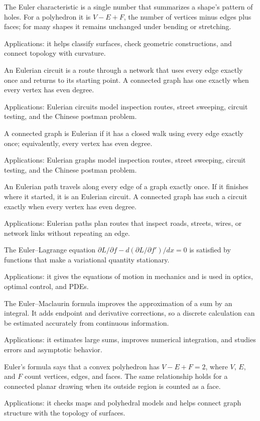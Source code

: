 The Euler characteristic is a single number that summarizes a shape's pattern of holes. For a polyhedron it is $V-E+F$, the number of vertices minus edges plus faces; for many shapes it remains unchanged under bending or stretching. \par\noindent Applications: it helps classify surfaces, check geometric constructions, and connect topology with curvature.

An Eulerian circuit is a route through a network that uses every edge exactly once and returns to its starting point. A connected graph has one exactly when every vertex has even degree. \par\noindent Applications: Eulerian circuits model inspection routes, street sweeping, circuit testing, and the Chinese postman problem.

A connected graph is Eulerian if it has a closed walk using every edge exactly once; equivalently, every vertex has even degree. \par\noindent Applications: Eulerian graphs model inspection routes, street sweeping, circuit testing, and the Chinese postman problem.

An Eulerian path travels along every edge of a graph exactly once. If it finishes where it started, it is an Eulerian circuit. A connected graph has such a circuit exactly when every vertex has even degree. \par\noindent Applications: Eulerian paths plan routes that inspect roads, streets, wires, or network links without repeating an edge.

The Euler--Lagrange equation $\partial L/\partial f-d(\partial L/\partial f')/dx=0$ is satisfied by functions that make a variational quantity stationary. \par\noindent Applications: it gives the equations of motion in mechanics and is used in optics, optimal control, and PDEs.

The Euler--Maclaurin formula improves the approximation of a sum by an integral. It adds endpoint and derivative corrections, so a discrete calculation can be estimated accurately from continuous information. \par\noindent Applications: it estimates large sums, improves numerical integration, and studies errors and asymptotic behavior.

Euler's formula says that a convex polyhedron has $V-E+F=2$, where $V$, $E$, and $F$ count vertices, edges, and faces. The same relationship holds for a connected planar drawing when its outside region is counted as a face. \par\noindent Applications: it checks maps and polyhedral models and helps connect graph structure with the topology of surfaces.

